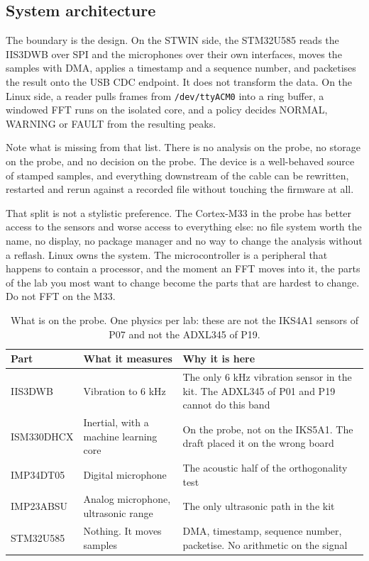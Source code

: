 \subsection*{System architecture}


The boundary is the design. On the STWIN side, the STM32U585 reads the IIS3DWB over SPI and the microphones over their own interfaces, moves the samples with DMA, applies a timestamp and a sequence number, and packetises the result onto the USB CDC endpoint. It does not transform the data. On the Linux side, a reader pulls frames from \texttt{/dev/ttyACM0} into a ring buffer, a windowed FFT runs on the isolated core, and a policy decides NORMAL, WARNING or FAULT from the resulting peaks.

Note what is missing from that list. There is no analysis on the probe, no storage on the probe, and no decision on the probe. The device is a well-behaved source of stamped samples, and everything downstream of the cable can be rewritten, restarted and rerun against a recorded file without touching the firmware at all.

That split is not a stylistic preference. The Cortex-M33 in the probe has better access to the sensors and worse access to everything else: no file system worth the name, no display, no package manager and no way to change the analysis without a reflash. Linux owns the system. The microcontroller is a peripheral that happens to contain a processor, and the moment an FFT moves into it, the parts of the lab you most want to change become the parts that are hardest to change. Do not FFT on the M33.

\begin{table}[H]\centering\small
\begin{tabular}{p{32mm}p{46mm}p{68mm}}
\toprule
Part & What it measures & Why it is here \\
\midrule
IIS3DWB & Vibration to 6 kHz & The only 6 kHz vibration sensor in the kit. The ADXL345 of P01 and P19 cannot do this band \\
ISM330DHCX & Inertial, with a machine learning core & On the probe, not on the IKS5A1. The draft placed it on the wrong board \\
IMP34DT05 & Digital microphone & The acoustic half of the orthogonality test \\
IMP23ABSU & Analog microphone, ultrasonic range & The only ultrasonic path in the kit \\
STM32U585 & Nothing. It moves samples & DMA, timestamp, sequence number, packetise. No arithmetic on the signal \\
\bottomrule
\end{tabular}
\caption{What is on the probe. One physics per lab: these are not the IKS4A1 sensors of P07 and not the ADXL345 of P19.}
\end{table}

